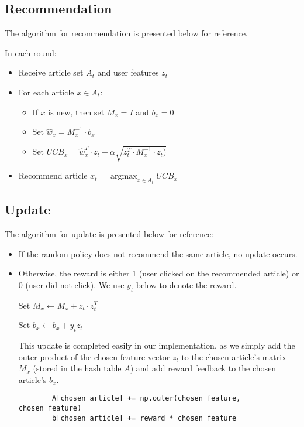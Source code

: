 \documentclass[a4paper, 11pt]{article}
\begin{document}
\subsection{Recommendation}

The algorithm for recommendation is presented below for reference.
\newline

In each round:
\begin{itemize}

\item Receive article set $A_t$ and user features $z_t$
\item For each article $x \in A_t$:

\begin{itemize}

    \item If $x$ is new, then set $M_x = I$ and $b_x = 0$
    \item Set $\hat{w}_x = M_x^{-1} \cdot b_x$
    \item Set $UCB_x = \hat{w}_x^T \cdot z_t + \alpha \sqrt{z_t^T \cdot M_x^{-1} \cdot z_t)}$

\end{itemize}
        
\item Recommend article $x_t = 
    \operatorname{argmax}_{x \in A_t} UCB_x$
        
\end {itemize}


\subsection{Update}

The algorithm for update is presented below for reference:
\newline

\begin{itemize}
    \item If the random policy does not recommend the same article, no update occurs.

    \item Otherwise, the reward is either 1 (user clicked on the recommended article) or 0 (user did not click). We use $y_t$ below to denote the reward.



    Set $M_x \leftarrow M_x + z_t \cdot z_t^T$

    Set $b_x \leftarrow b_x + y_t z_t$

    This update is completed easily in our implementation, as we simply add the outer product of the chosen feature vector $z_t$ to the chosen article's matrix $M_x$ (stored in the hash table $A$) and add reward feedback to the chosen article's $b_x$.
    \begin{verbatim}
        A[chosen_article] += np.outer(chosen_feature, chosen_feature)
        b[chosen_article] += reward * chosen_feature
    \end{verbatim}
\end{itemize}
\end{document}
